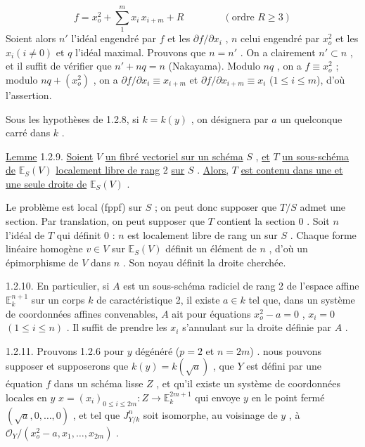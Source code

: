 \begin{equation*}
f = x_o^2 + \sum_1^m x_i\, x_{i+m} + R \qquad\qquad (\text{ordre } R \geq 3)
\end{equation*}
Soient alors $n'$ l'idéal engendré par $f$ et les $\partial f/\partial x_i$ , $n$ celui engendré par $x_o^2$ et les $x_i(i \neq 0)$ et $q$ l'idéal maximal. Prouvons que $n = n'$ . On a clairement $n' \subset n$ , et il suffit de vérifier que $n' + nq = n$ (Nakayama). Modulo $nq$ , on a $f \equiv x_o^2$ ; modulo $nq + (x_o^2)$ , on a $\partial f/\partial x_i \equiv x_{i+m}$ et $\partial f/\partial x_{i+m} \equiv x_i$ ($1 \leq i \leq m$), d'où l'assertion.

Sous les hypothèses de 1.2.8, si $k = k(y)$ , on désignera par $a$ un quelconque carré dans $k$ .



\underline{Lemme} 1.2.9. \underline{Soient} $V$ \underline{un fibré vectoriel sur un schéma} $S$ , \underline{et} $T$ \underline{un sous-schéma de} $\mathbb{E}_S(V)$ \underline{localement libre de rang} 2 \underline{sur} $S$ . \underline{Alors,} $T$ \underline{est contenu dans une et une seule droite de} $\mathbb{E}_S(V)$ .

Le problème est local (fppf) sur $S$ ; on peut donc supposer que $T/S$ admet une section. Par translation, on peut supposer que $T$ contient la section $0$ . Soit $n$ l'idéal de $T$ qui définit $0$ : $n$ est localement libre de rang un sur $S$ . Chaque forme linéaire homogène $v \in V$ sur $\mathbb{E}_S(V)$ définit un élément de $n$ , d'où un épimorphisme de $V$ dans $n$ . Son noyau définit la droite cherchée.

1.2.10. En particulier, si $A$ est un sous-schéma radiciel de rang 2 de l'espace affine $\mathbb{E}_k^{n+1}$ sur un corps $k$ de caractéristique 2, il existe $a \in k$ tel que, dans un système de coordonnées affines convenables, $A$ ait pour équations $x_o^2 - a = 0$ , $x_i = 0$ $(1 \leq i \leq n)$ . Il suffit de prendre les $x_i$ s'annulant sur la droite définie par $A$ .

1.2.11. Prouvons 1.2.6 pour $y$ dégénéré ($p = 2$ et $n = 2m$) . nous pouvons supposer et supposerons que $k(y) = k(\sqrt{a})$ , que $Y$ est défini par une équation $f$ dans un schéma lisse $Z$ , et qu'il existe un système de coordonnées locales en $y$ $x = (x_i)_{0 \leq i \leq 2m} : Z \longrightarrow \mathbb{E}_k^{2m+1}$ qui envoye $y$ en le point fermé $(\sqrt{a},0,\ldots,0)$ , et tel que $J^n_{Y/k}$ soit isomorphe, au voisinage de $y$ , à $\mathcal{O}_Y /(x_o^2 - a , x_1,\ldots,x_{2m})$ .

